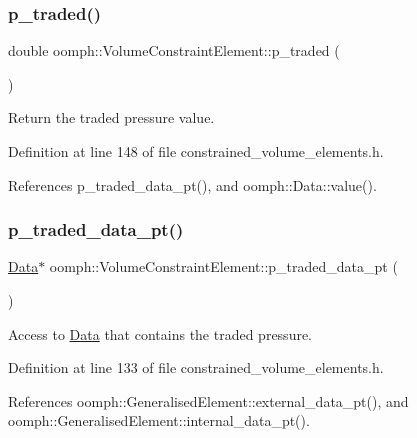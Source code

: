 \subsubsection{\texorpdfstring{p\+\_\+traded()}{p\_traded()}}
{\footnotesize\ttfamily double oomph\+::\+Volume\+Constraint\+Element\+::p\+\_\+traded (\begin{DoxyParamCaption}{ }\end{DoxyParamCaption})\hspace{0.3cm}{\ttfamily [inline]}}



Return the traded pressure value. 



Definition at line 148 of file constrained\+\_\+volume\+\_\+elements.\+h.



References p\+\_\+traded\+\_\+data\+\_\+pt(), and oomph\+::\+Data\+::value().

\mbox{\label{classoomph_1_1VolumeConstraintElement_a60d17437a54648747c956b7a7067c592}} 
\subsubsection{\texorpdfstring{p\+\_\+traded\+\_\+data\+\_\+pt()}{p\_traded\_data\_pt()}}
{\footnotesize\ttfamily \hyperlink{classoomph_1_1Data}{Data}$\ast$ oomph\+::\+Volume\+Constraint\+Element\+::p\+\_\+traded\+\_\+data\+\_\+pt (\begin{DoxyParamCaption}{ }\end{DoxyParamCaption})\hspace{0.3cm}{\ttfamily [inline]}}



Access to \hyperlink{classoomph_1_1Data}{Data} that contains the traded pressure. 



Definition at line 133 of file constrained\+\_\+volume\+\_\+elements.\+h.



References oomph\+::\+Generalised\+Element\+::external\+\_\+data\+\_\+pt(), and oomph\+::\+Generalised\+Element\+::internal\+\_\+data\+\_\+pt().



